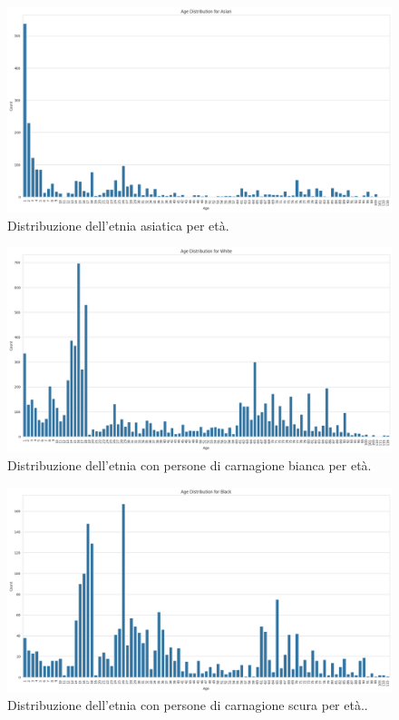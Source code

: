 \documentclass[a4paper,12pt]{report}
\begin{document}
	\begin{figure}[H]
		\centering
		\includegraphics[width=1.0\textwidth]{img/bar_ethnic_asian_image.png}
		\caption{Distribuzione dell'etnia asiatica per età.}
	\end{figure}
	\begin{figure}[H]
		\centering
		\includegraphics[width=1.0\textwidth]{img/pie_ethnic_white_image.png}
		\caption{Distribuzione dell'etnia con persone di carnagione bianca per età.}
	\end{figure}
	\begin{figure}[H]
		\centering
		\includegraphics[width=1.0\textwidth]{img/pie_ethnic_black_image.png}
		\caption{Distribuzione dell'etnia con persone di carnagione scura per età..}
	\end{figure}
\end{document}
